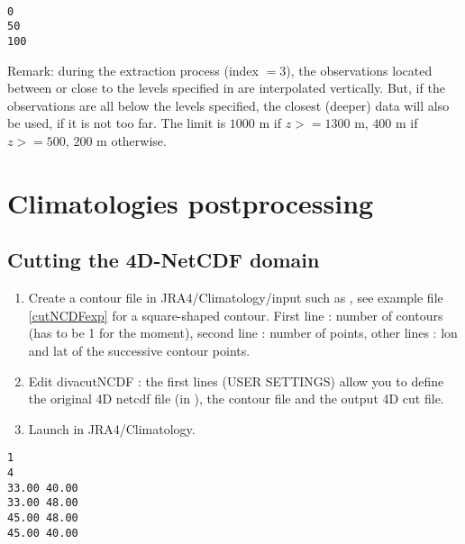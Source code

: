 \begin{center}
\begin{exfile}[H] %
\begin{footnotesize}
\begin{verbatim}

0
50
100

\end{verbatim}
\end{footnotesize}
\caption{}
\label{contourfrombottom.depth}
\end{exfile}
\end{center}

Remark: during the extraction process (index $=3$), the observations located between or close to the levels specified in  are interpolated vertically. But, if the observations are all below the levels specified, the closest (deeper) data will also be used, if it is not too far. The limit is $1000$ m if $z>=1300$ m, $400$ m if $z>=500$, $200$ m otherwise.

\section{Climatologies postprocessing}

\subsection{Cutting the 4D-NetCDF domain}

\begin{enumerate}
 \item Create a contour file in JRA4/Climatology/input such as , see example file \ref{cutNCDFexp} for a square-shaped contour. First line : number of contours 
 (has to be 1 for the moment), second line : number of points, other lines : lon and lat of the successive contour points.
 \item Edit divacutNCDF : the first lines (USER SETTINGS) allow you to define the original 4D netcdf file (in ), the contour file 
 and the output 4D cut file.
 \item Launch  in JRA4/Climatology.
\end{enumerate}

\begin{center}
\begin{exfile}[H] %
\begin{footnotesize}
\begin{verbatim}
1
4
33.00 40.00
33.00 48.00
45.00 48.00
45.00 40.00
\end{verbatim}
\end{footnotesize}
\caption{}
\label{cutNCDFexp}
\end{exfile}
\end{center}
